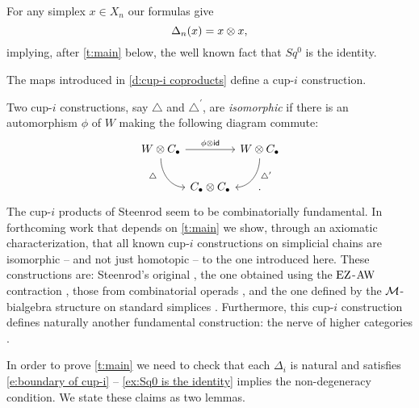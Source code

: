\begin{example} \label{ex:Sq0 is the identity}
	For any simplex $x \in X_n$ our formulas give
	\begin{equation*}
	\Delta_n(x) = x \otimes x,
	\end{equation*}
	implying, after \cref{t:main} below, the well known fact that $Sq^0$ is the identity.
\end{example}

\begin{theorem} \label{t:main}
	The maps introduced in \cref{d:cup-i coproducts} define a cup-$i$ construction.
\end{theorem}

\begin{remark}
	Two \mbox{cup-$i$} constructions, say $\triangle$ and $\triangle^\prime$, are \textit{isomorphic} if there is an automorphism $\phi$ of $W$ making the following diagram commute:
	\[
	\begin{tikzcd} [column sep = 0, row sep=normal]
	W \ot C_\bullet \arrow[rr, "\phi \ot \id"] \arrow[rd, in=180, out=-90, "\triangle^{\phantom{\prime}}"', near start] & &
	W \ot C_\bullet \arrow[ld, in=0, out=-90, "\triangle^\prime", near start] \\
	& C_\bullet \ot C_\bullet & .
	\end{tikzcd}
	\]
	The cup-$i$ products of Steenrod seem to be combinatorially fundamental.
	In forthcoming work \cite{medina2022axiomatic} that depends on \cref{t:main} we show, through an axiomatic characterization, that all known cup-$i$ constructions on simplicial chains are isomorphic -- and not just homotopic -- to the one introduced here.
	These constructions are: Steenrod's original \cite{steenrod1947products}, the one obtained using the $\operatorname{EZ}$-$\operatorname{AW}$ contraction \cite{real1996computability, gonzalez-diaz1999steenrod}, those from combinatorial operads \cite{mcclure2003multivariable, berger2004combinatorial}, and the one defined by the $\mathcal{M}$-bialgebra structure on standard simplices \cite{medina2020prop1, medina2021prop2}.
	Furthermore, this cup-$i$ construction defines naturally another fundamental construction: the nerve of higher categories \cite{street1987orientals, medina2020globular}.
\end{remark}


In order to prove \cref{t:main} we need to check that each $\Delta_i$ is natural and satisfies \eqref{e:boundary of cup-i} -- \cref{ex:Sq0 is the identity} implies the non-degeneracy condition.
We state these claims as two lemmas.

